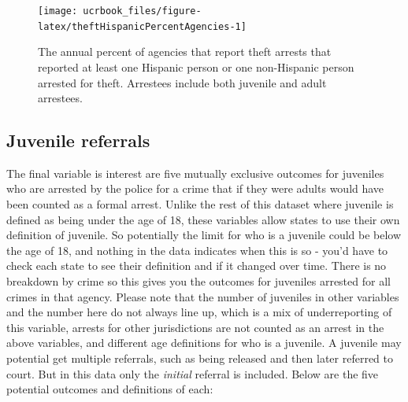 \documentclass[
  12pt,
  openany]{book}
\begin{document}
\begin{figure}

{\centering \texttt{[image: ucrbook\_files/figure-latex/theftHispanicPercentAgencies-1]} 

}

\caption{The annual percent of agencies that report theft arrests that reported at least one Hispanic person or one non-Hispanic person arrested for theft. Arrestees include both juvenile and adult arrestees.}\label{fig:theftHispanicPercentAgencies}
\end{figure}

\hypertarget{juvenile-referrals}{%
\subsection{Juvenile referrals}\label{juvenile-referrals}}

The final variable is interest are five mutually exclusive outcomes for juveniles who are arrested by the police for a crime that if they were adults would have been counted as a formal arrest. Unlike the rest of this dataset where juvenile is defined as being under the age of 18, these variables allow states to use their own definition of juvenile. So potentially the limit for who is a juvenile could be below the age of 18, and nothing in the data indicates when this is so - you'd have to check each state to see their definition and if it changed over time. There is no breakdown by crime so this gives you the outcomes for juveniles arrested for all crimes in that agency. Please note that the number of juveniles in other variables and the number here do not always line up, which is a mix of underreporting of this variable, arrests for other jurisdictions are not counted as an arrest in the above variables, and different age definitions for who is a juvenile. A juvenile may potential get multiple referrals, such as being released and then later referred to court. But in this data only the \emph{initial} referral is included. Below are the five potential outcomes and definitions of each:
\end{document}
